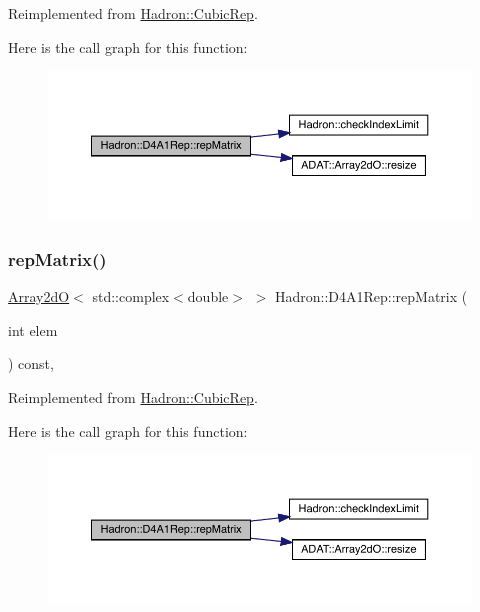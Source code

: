Reimplemented from \mbox{\hyperlink{structHadron_1_1CubicRep_ac5d7e9e6f4ab1158b5fce3e4ad9e8005}{Hadron\+::\+Cubic\+Rep}}.

Here is the call graph for this function\+:
\nopagebreak
\begin{figure}[H]
\begin{center}
\leavevmode
\includegraphics[width=350pt]{d8/d02/structHadron_1_1D4A1Rep_a4dca745781630db08cee88f37cae21b6_cgraph}
\end{center}
\end{figure}
\mbox{\label{structHadron_1_1D4A1Rep_a4dca745781630db08cee88f37cae21b6}} 
\subsubsection{\texorpdfstring{repMatrix()}{repMatrix()}\hspace{0.1cm}{\footnotesize\ttfamily [3/3]}}
{\footnotesize\ttfamily \mbox{\hyperlink{classADAT_1_1Array2dO}{Array2dO}}$<$ std\+::complex$<$double$>$ $>$ Hadron\+::\+D4\+A1\+Rep\+::rep\+Matrix (\begin{DoxyParamCaption}\item[{int}]{elem }\end{DoxyParamCaption}) const\hspace{0.3cm}{\ttfamily [inline]}, {\ttfamily [virtual]}}



Reimplemented from \mbox{\hyperlink{structHadron_1_1CubicRep_ac5d7e9e6f4ab1158b5fce3e4ad9e8005}{Hadron\+::\+Cubic\+Rep}}.

Here is the call graph for this function\+:
\nopagebreak
\begin{figure}[H]
\begin{center}
\leavevmode
\includegraphics[width=350pt]{d8/d02/structHadron_1_1D4A1Rep_a4dca745781630db08cee88f37cae21b6_cgraph}
\end{center}
\end{figure}


